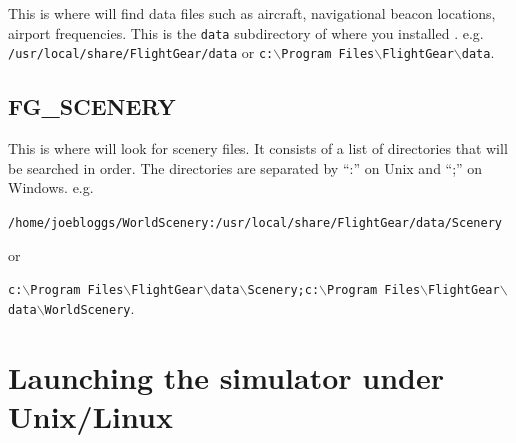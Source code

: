 This is where \FlightGear{} will find data files such as aircraft, navigational
beacon locations, airport frequencies. This is the \texttt{data} subdirectory
of where you installed \FlightGear{}. e.g.
\texttt{/usr/local/share/FlightGear/data} or
\texttt{c:$\backslash$Program Files$\backslash$FlightGear$\backslash$data}.

\subsection{FG\_SCENERY}

This is where \FlightGear{} will look for scenery files. It consists of a list
of directories that will be searched in order. The directories are separated
by ``:'' on Unix and ``;'' on Windows. e.g.

\noindent
{\footnotesize{\texttt{/home/joebloggs/WorldScenery:/usr/local/share/FlightGear/data/Scenery}}}

\noindent
or

\noindent
{\footnotesize{\texttt{c:$\backslash$Program Files$\backslash$FlightGear$\backslash$data$\backslash$Scenery;c:$\backslash$Program Files$\backslash$FlightGear$\backslash$data$\backslash$WorldScenery}}}.

\section{Launching the simulator under Unix/Linux}

\centerline{}
\smallskip

